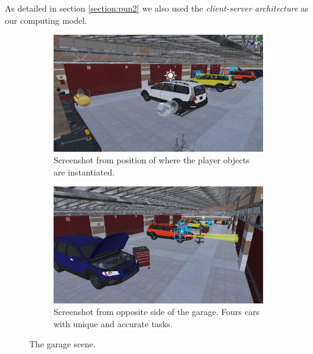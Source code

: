As detailed in section \ref{section:pun2} we also used the \textit{client-server architecture} as our computing model. 

\begin{figure}[H]
  \centering
  \begin{subfigure}[b]{0.47\textwidth}
    \includegraphics[width=1\textwidth]{fig/phase_2/implementation/workshop1.PNG}
    \caption{Screenshot from position of where the player objects are instantiated.}
    \label{fig:garage1}
  \end{subfigure}
  \hfill%
  \begin{subfigure}[b]{0.47\textwidth}
    \includegraphics[width=1\textwidth]{fig/phase_2/implementation/workshop2.PNG}
    \caption{Screenshot from opposite side of the garage. Fours cars with unique and accurate tasks.}
    \label{fig:garage2}
  \end{subfigure}
  \hfill%
  \caption{The garage scene.}
  \label{fig:phase2Garage}
\end{figure}


